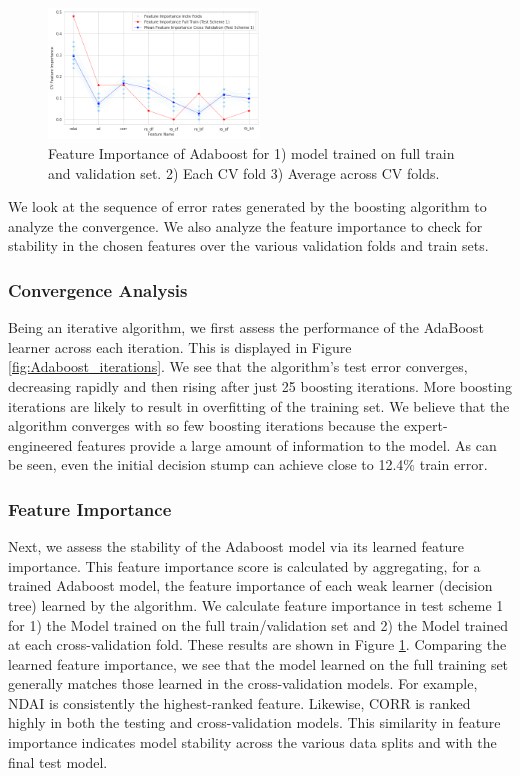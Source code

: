 \documentclass[11pt, letterpaper, journal]{IEEEtran}
\begin{document}
\begin{figure}[h]
    \centering
    \includegraphics[width=0.5\textwidth]{statics/Feature_importance_test_scheme1_tr_23_te_1.png}
    \caption{Feature Importance of Adaboost for 1) model trained on full train and validation set. 2) Each CV fold 3) Average across CV folds.}
    \label{fig:Feature_importance ts1}
\end{figure}

We look at the sequence of error rates generated by the boosting algorithm to analyze the convergence. We also analyze the feature importance to check for stability in the chosen features over the various validation folds and train sets.

\subsubsection{Convergence Analysis}
Being an iterative algorithm, we first assess the performance of the AdaBoost learner across each iteration. This is displayed in Figure \ref{fig:Adaboost_iterations}. We see that the algorithm's test error converges, decreasing rapidly and then rising after just 25 boosting iterations. More boosting iterations are likely to result in overfitting of the training set. We believe that the algorithm converges with so few boosting iterations because the expert-engineered features provide a large amount of information to the model. As can be seen, even the initial decision stump can achieve close to 12.4\% train error.

\subsubsection{Feature Importance}
Next, we assess the stability of the Adaboost model via its learned feature importance. This feature importance score is calculated by aggregating, for a trained Adaboost model, the feature importance of each weak learner (decision tree) learned by the algorithm. We calculate feature importance in test scheme 1 for 1) the Model trained on the full train/validation set and 2) the Model trained at each cross-validation fold. These results are shown in Figure \ref{fig:Feature_importance ts1}. Comparing the learned feature importance, we see that the model learned on the full training set generally matches those learned in the cross-validation models. For example, NDAI is consistently the highest-ranked feature. Likewise, CORR is ranked highly in both the testing and cross-validation models. This similarity in feature importance indicates model stability across the various data splits and with the final test model. 
\end{document}
